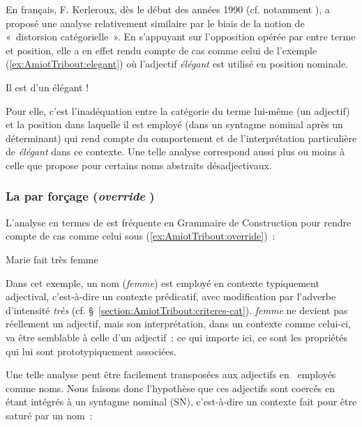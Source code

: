 \documentclass[output=paper]{LSP/langsci}
\begin{document}
En français, F. Kerleroux, dès le début des années 1990 (cf. notamment \citealt{kerleroux91, kerleroux96}), a proposé une analyse relativement similaire par le biais de la notion de «~distorsion catégorielle~». En s'appuyant sur l'opposition opérée par \cite{milner89} entre terme et position, elle a en effet rendu compte de cas comme celui de l'exemple (\ref{ex:AmiotTribout:elegant}) où l'adjectif \textit{élégant} est utilisé en position nominale.

\begin{exe}
\ex \label{ex:AmiotTribout:elegant}   Il est d'un élégant !
\end{exe}

Pour elle, c'est l'inadéquation entre la catégorie du terme lui-même (un adjectif) et la position dans laquelle il est employé (dans un syntagme nominal après un déterminant) qui rend compte du comportement et de l'interprétation particulière de \textit{élégant} dans ce contexte. Une telle analyse correspond aussi plus ou moins à celle que propose \cite{lauwers14b} pour certains noms abstraits désadjectivaux.


\subsubsection{La  par forçage (\textit{override })} \label{section:AmiotTribout:override}
\largerpage
L'analyse en termes de  est fréquente en Grammaire de Construction pour rendre compte de cas comme celui sous (\ref{ex:AmiotTribout:override})~:

\begin{exe}
\ex \label{ex:AmiotTribout:override} Marie fait très femme
\end{exe}


Dans cet exemple, un nom (\textit{femme}) est employé en contexte typiquement adjectival, c'est-à-dire un contexte prédicatif, avec modification par l'adverbe d'intensité \textit{très} (cf. §~\ref{section:AmiotTribout:criteres-cat}). \textit{femme} ne devient pas réellement un adjectif, mais son interprétation, dans un contexte comme celui-ci, va être semblable à celle d'un adjectif~: ce qui importe ici, ce sont les propriétés qui lui sont prototypiquement associées.

Une telle analyse peut être facilement transposées aux adjectifs en \iste\ employés comme noms. Nous faisons donc l'hypothèse que ces adjectifs sont coercés en étant intégrés à un syntagme nominal (SN), c'est-à-dire un contexte fait pour être saturé par un nom~:
\end{document}

